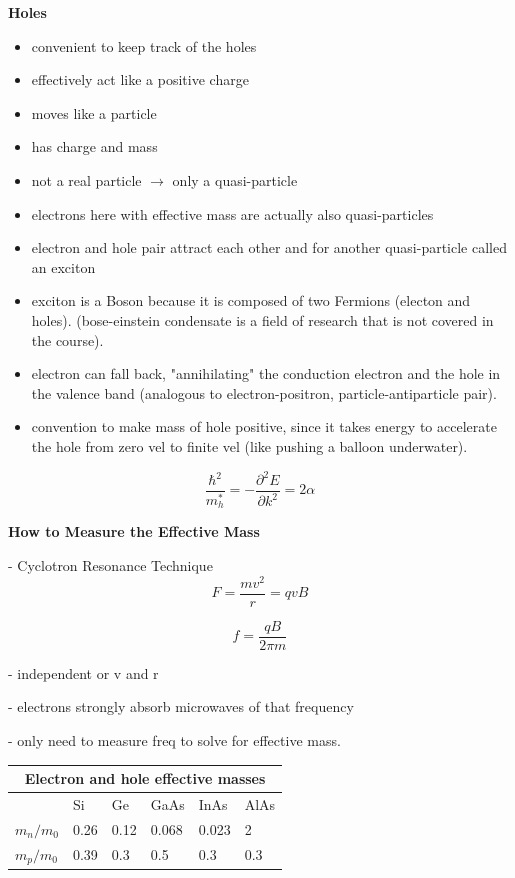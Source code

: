 \textbf{Holes}
\begin{itemize}
    \item convenient to keep track of the holes 
    \item effectively act like a positive charge
    \item moves like a particle
    \item has charge and mass
    \item not a real particle $\xrightarrow{}$ only a quasi-particle
    \item electrons here with effective mass are actually also quasi-particles
    \item electron and hole pair attract each other and for another quasi-particle called an exciton
    \item exciton is a Boson because it is composed of two Fermions (electon and holes). (bose-einstein condensate is a field of research that is not covered in the course).
    \item electron can fall back, "annihilating" the conduction electron and the hole in the valence band (analogous to electron-positron, particle-antiparticle pair).
    \item convention to make mass of hole positive, since it takes energy to accelerate the hole from zero vel to finite vel (like pushing a balloon underwater).
\end{itemize}


\begin{equation}
    \frac{\hbar^2}{m_h^*} = -\frac{\partial ^2E}{\partial k^2} = 2 \alpha
\end{equation}

\textbf{How to Measure the Effective Mass}

- Cyclotron Resonance Technique
\[F = \frac{mv^2}{r} = qvB\]

\[ f = \frac{qB}{2\pi m} \]

- independent or v and r 

- electrons strongly absorb microwaves of that frequency

- only need to measure freq to solve for effective mass.



\begin{tabular}{ |p{1.5cm}|p{1.5cm}|p{1.5cm}|p{1.5cm}|p{1.5cm}|p{1.5cm}|  }
 \hline
 \multicolumn{6}{|c|}{\textbf{Electron and hole effective masses}} \\
 \hline
    & Si & Ge & GaAs & InAs & AlAs\\
 \hline
 $m_n/m_0$ & 0.26 & 0.12 & 0.068 & 0.023 & 2 \\
 $m_p/m_0$ & 0.39 & 0.3 & 0.5 & 0.3 & 0.3 \\
 \hline
\end{tabular}

